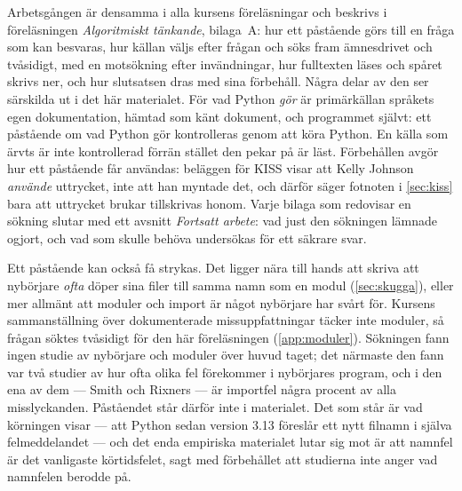 Arbetsgången är densamma i alla kursens föreläsningar och beskrivs i
föreläsningen \emph{Algoritmiskt tänkande}, bilaga~A: hur ett påstående
görs till en fråga som kan besvaras, hur källan väljs efter frågan och
söks fram ämnesdrivet och tvåsidigt, med en motsökning efter
invändningar, hur fulltexten läses och spåret skrivs ner, och hur
slutsatsen dras med sina förbehåll.  Några delar av den ser särskilda ut
i det här materialet.  För vad Python \emph{gör} är primärkällan språkets
egen dokumentation, hämtad som känt dokument, och programmet självt: ett
påstående om vad Python gör kontrolleras genom att köra Python.  En
källa som ärvts är inte kontrollerad förrän stället den pekar på är
läst.%
  Förbehållen avgör hur ett påstående får användas:
beläggen för KISS visar att Kelly Johnson \emph{använde} uttrycket, inte
att han myntade det, och därför säger fotnoten i \cref{sec:kiss} bara att
uttrycket brukar tillskrivas honom.%
  Varje
bilaga som redovisar en sökning slutar med ett avsnitt \emph{Fortsatt
arbete}: vad just den sökningen lämnade ogjort, och vad som skulle
behöva undersökas för ett säkrare svar.

Ett påstående kan också få strykas.  Det ligger nära till hands att
skriva att nybörjare \emph{ofta} döper sina filer till samma namn som en
modul (\cref{sec:skugga}), eller mer allmänt att moduler och import är
något nybörjare har svårt för.  Kursens sammanställning över
dokumenterade missuppfattningar \autocite{SooriBosk2026} täcker inte
moduler, så frågan söktes tvåsidigt för den här föreläsningen
(\cref{app:moduler}).  Sökningen
fann ingen studie av nybörjare och moduler över huvud taget; det
närmaste den fann var två studier av hur ofta olika fel förekommer i
nybörjares program, och i den ena av dem --- Smith och Rixners --- är
importfel några procent av alla misslyckanden.  Påståendet står därför
inte i materialet.  Det som står är vad körningen visar --- att Python
sedan version 3.13 föreslår ett
nytt filnamn i själva felmeddelandet --- och det enda empiriska
materialet lutar sig mot är att namnfel är det vanligaste körtidsfelet,
sagt med förbehållet att studierna inte anger vad namnfelen berodde på.

